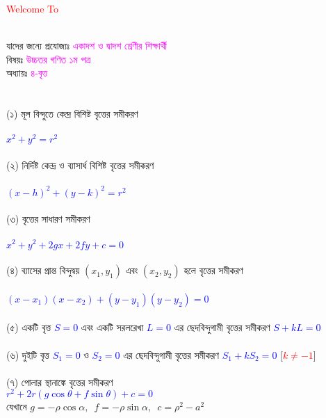 \documentclass{article}
\begin{document}
 
	\Large
	\textcolor{red}{Welcome To} 
	\\
	\\
	যাদের জন্যে প্রযোজ্যঃ  	\textcolor{magenta}{একাদশ ও দ্বাদশ শ্রেণীর শিক্ষার্থী} \\
	বিষয়ঃ \textcolor{magenta}{উচ্চতর গণিত ১ম পত্র} \\
	অধ্যায়ঃ \textcolor{magenta}{৪-বৃত্ত}\\ 
	\\
	\\
	(১)  মূল বিন্দুতে কেন্দ্র বিশিষ্ট বৃত্তের সমীকরণ  \\
	\\
	\textcolor{blue}{$x^2+y^2=r^2$}\\
	\\
	(২) নির্দিষ্ট কেন্দ্র ও ব্যাসার্ধ বিশিষ্ট বৃত্তের  সমীকরণ \\
	\\
	\textcolor{blue}{$(x-h)^2+(y-k)^2=r^2$}\\
	\\
	(৩) বৃত্তের সাধারণ সমীকরণ\\
	\\  
	\textcolor{blue}{$x^2+y^2+2gx+2fy+c=0$}\\
	\\
	(৪) ব্যাসের প্রান্ত বিন্দুদ্বয় $(x_1,y_1)$ এবং $(x_2,y_2)$ হলে বৃত্তের সমীকরণ\\
	\\ 
	\textcolor{blue}{$(x-x_1)(x-x_2)+(y-y_1)(y-y_2)=0$}\\
	\\
	(৫) একটি বৃত্ত \textcolor{blue}{$S=0$ }এবং একটি সরলরেখা \textcolor{blue}{$L=0$}  এর ছেদবিন্দুগামী বৃত্তের সমীকরণ  \textcolor{blue}{$S+kL=0$} \\
	\\
	(৬) দুইটি বৃত্ত \textcolor{blue}{$S_1=0$} ও \textcolor{blue}{$S_2=0$} এর ছেদবিন্দুগামী বৃত্তের সমীকরণ \textcolor{blue}{$S_1+kS_2=0$}\,\,[\textcolor{red}{$k\ne -1$}]\\  \\
	(৭) পোলার স্থানাঙ্কে বৃত্তের  সমীকরণ \\
	\textcolor{blue}{$r^2+2r(g\cos \theta+f\sin \theta )+c=0$}\\
	যেখানে 	$g=-\rho \cos \alpha,\,\,\,f=-\rho \sin \alpha,\,\,\,c=\rho^2-a^2 $\\
	\\ 
\end{document}
